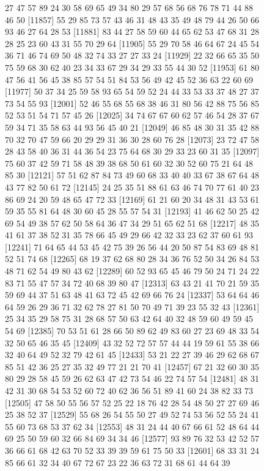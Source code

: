 \documentclass{article}
\begin{document}
\begin{figure}[H]
\begin{Schunk}
\begin{Soutput}
[11833] 27 47 57 89 24 30 58 69 65 49 34 80 29 57 68 56 68 76 78 71 44 88 46 50
[11857] 55 29 85 73 57 43 46 31 48 43 35 49 48 79 44 26 50 66 93 46 27 64 28 53
[11881] 83 44 27 58 59 60 44 65 62 53 47 68 31 28 28 25 23 60 43 31 55 70 29 64
[11905] 55 29 70 58 46 64 67 24 45 54 36 71 46 74 69 50 48 32 74 33 27 27 33 24
[11929] 22 32 66 65 35 50 75 59 68 30 62 40 23 34 33 67 29 34 29 33 55 44 30 52
[11953] 61 80 47 56 41 56 45 38 85 57 54 51 84 53 56 49 42 45 52 36 63 22 60 69
[11977] 50 37 34 25 59 58 93 65 54 59 52 24 44 33 53 33 37 48 27 37 73 54 55 93
[12001] 52 46 55 68 55 68 38 46 31 80 56 42 88 75 56 85 52 53 51 54 71 57 45 26
[12025] 34 74 67 67 60 62 57 46 54 28 37 67 59 34 71 35 58 63 44 93 56 45 40 21
[12049] 46 85 48 30 31 35 42 88 70 32 70 47 59 66 20 29 29 31 36 30 28 60 76 28
[12073] 23 72 47 58 28 43 58 40 36 31 44 36 54 23 75 64 68 30 29 33 23 60 31 35
[12097] 75 60 37 42 59 71 58 48 39 38 68 50 61 60 32 30 52 60 75 21 64 48 85 30
[12121] 57 51 62 87 84 73 49 60 68 33 40 40 33 67 38 67 64 48 43 77 82 50 61 72
[12145] 24 25 35 51 88 61 63 46 74 70 77 61 40 23 86 69 24 20 59 48 65 47 72 33
[12169] 61 21 60 20 34 48 31 43 53 61 59 35 55 81 64 48 30 60 45 28 55 57 54 31
[12193] 41 46 62 50 25 42 69 54 49 38 57 62 50 58 64 36 47 34 29 51 65 62 51 68
[12217] 48 35 41 61 37 38 52 31 35 78 66 45 49 29 66 42 32 33 23 62 37 60 61 93
[12241] 71 64 65 44 53 45 42 75 39 26 56 44 20 50 87 54 83 69 48 81 52 51 74 68
[12265] 68 19 37 62 68 80 28 34 36 76 52 50 34 26 84 53 48 71 62 54 49 80 43 62
[12289] 60 52 93 65 45 46 79 50 24 71 24 22 83 71 55 47 57 34 72 40 68 39 80 47
[12313] 63 43 21 41 70 21 59 35 59 69 44 37 51 63 48 41 63 72 45 42 69 66 76 24
[12337] 53 64 64 46 64 59 26 29 36 71 32 62 78 27 81 50 70 49 71 39 23 55 32 43
[12361] 25 34 35 29 58 75 31 28 68 57 50 63 42 64 40 32 48 59 60 49 59 45 54 69
[12385] 70 53 51 61 28 66 50 89 62 49 83 60 27 23 69 48 33 54 32 50 65 46 35 45
[12409] 43 32 52 72 57 57 44 44 19 59 61 55 38 66 32 40 64 49 52 32 79 42 61 45
[12433] 53 21 22 27 39 46 29 62 68 67 85 51 42 36 25 27 35 32 49 77 21 21 70 41
[12457] 67 21 32 60 30 35 80 29 28 58 45 59 26 62 63 47 42 73 54 46 22 74 57 54
[12481] 48 31 42 31 30 68 54 53 52 60 72 40 62 36 56 51 89 41 60 24 38 82 33 73
[12505] 47 58 50 55 56 57 52 25 22 18 76 42 28 54 48 50 27 27 69 46 25 38 52 37
[12529] 55 68 26 54 55 50 27 49 52 74 53 56 52 55 24 41 55 60 73 68 53 37 62 34
[12553] 48 31 24 44 40 67 66 61 52 48 64 44 69 25 50 59 60 32 66 84 69 34 34 46
[12577] 93 89 76 32 53 42 52 57 36 66 61 68 42 63 70 52 33 39 39 59 61 75 50 33
[12601] 68 33 31 24 85 66 61 32 34 40 67 72 67 23 22 36 63 72 31 68 61 44 64 39

\end{Soutput}
\end{Schunk}
\end{figure}
\end{document}
